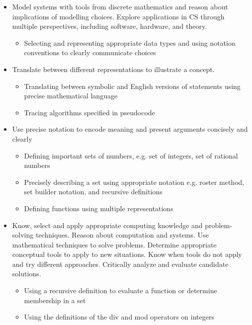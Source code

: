 \documentclass[12pt, oneside]{article}
\begin{document}
\begin{itemize}
\item Model systems with tools from discrete mathematics and reason about implications of modelling choices. Explore applications in CS through multiple perspectives, including software, hardware, and theory.
\begin{itemize}

   \item Selecting and representing appropriate data types and using notation conventions to clearly communicate choices

\end{itemize}

\item Translate between different representations to illustrate a concept.

\begin{itemize}
   \item Translating between symbolic and English versions of statements using precise mathematical language
   \item Tracing algorithms specified in pseudocode
\end{itemize}


\item Use precise notation to encode meaning and present arguments concisely and clearly
\begin{itemize}
    \item Defining important sets of numbers, e.g. set of integers, set of rational numbers
    \item Precisely describing a set using appropriate notation e.g. roster method, set builder notation, and recursive definitions
    \item Defining functions using multiple representations
\end{itemize}

\item Know, select and apply appropriate computing knowledge and problem-solving techniques. Reason about computation and systems. Use mathematical techniques to solve problems. Determine appropriate conceptual tools to apply to new situations. Know when tools do not apply and try different approaches. Critically analyze and evaluate candidate solutions.
\begin{itemize}
    \item Using a recursive definition to evaluate a function or determine membership in a set
    \item  Using the definitions of the div and mod operators on integers

\end{itemize}

\end{itemize}
\end{document}
